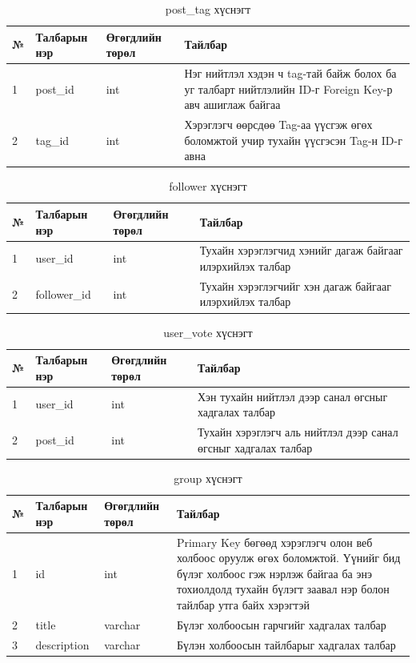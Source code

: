 \begin{table}[h]
	\caption{post\_tag хүснэгт}
	\begin{tabular}{|l|l|l|p{8cm}|}
	\hline
	№ &  Талбарын нэр & Өгөгдлийн төрөл & Тайлбар \\ \hline
	1 &  post\_id & int & Нэг нийтлэл хэдэн ч tag-тай байж болох ба уг талбарт нийтлэлийн ID-г Foreign Key-р авч ашиглаж байгаа \\ \hline
	2 &  tag\_id & int & Хэрэглэгч өөрсдөө Tag-аа үүсгэж өгөх боломжтой учир тухайн үүсгэсэн Tag-н ID-г авна \\ \hline

\end{tabular}
\end{table}

\begin{table}[h]
	\caption{follower хүснэгт}
	\begin{tabular}{|l|l|l|p{8cm}|}
	\hline
	№ &  Талбарын нэр & Өгөгдлийн төрөл & Тайлбар \\ \hline
	1 &  user\_id & int & Тухайн хэрэглэгчид хэнийг дагаж байгааг илэрхийлэх талбар \\ \hline
	2 &  follower\_id & int & Тухайн хэрэглэгчийг хэн дагаж байгааг илэрхийлэх талбар \\ \hline

\end{tabular}
\end{table}

\begin{table}[h]
	\caption{user\_vote хүснэгт}
	\begin{tabular}{|l|l|l|p{8cm}|}
	\hline
	№ &  Талбарын нэр & Өгөгдлийн төрөл & Тайлбар \\ \hline
	1 &  user\_id & int & Хэн тухайн нийтлэл дээр санал өгсныг хадгалах талбар \\ \hline
	2 &  post\_id & int & Тухайн хэрэглэгч аль нийтлэл дээр санал өгсныг хадгалах талбар \\ \hline

\end{tabular}
\end{table}

\begin{table}[h]
	\caption{group хүснэгт}
	\begin{tabular}{|l|l|l|p{8cm}|}
	\hline
	№ &  Талбарын нэр & Өгөгдлийн төрөл & Тайлбар \\ \hline
	1 &  id & int & Primary Key бөгөөд хэрэглэгч олон веб холбоос оруулж өгөх боломжтой. Үүнийг бид бүлэг холбоос гэж нэрлэж байгаа ба энэ тохиолдолд тухайн бүлэгт заавал нэр болон тайлбар утга байх хэрэгтэй \\ \hline
	2 &  title & varchar & Бүлэг холбоосын гарчгийг хадгалах талбар \\ \hline
	3 &  description & varchar & Бүлэн холбоосын тайлбарыг хадгалах талбар \\ \hline

\end{tabular}
\end{table}

